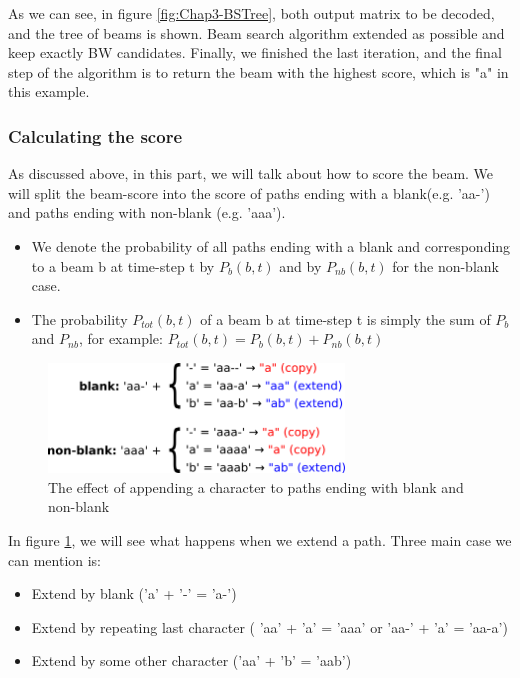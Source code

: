 As we can see, in figure \ref{fig:Chap3-BSTree}, both output matrix to be decoded, and the tree of beams is shown. Beam search algorithm extended as possible and keep exactly BW candidates. Finally, we finished the last iteration, and the final step of the algorithm is to return the beam with the highest score, which is "a" in this example.

\subsubsection{Calculating the score}

As discussed above, in this part, we will talk about how to score the beam. We will split the beam-score into the score of paths ending with a blank(e.g. 'aa-') and paths ending with non-blank (e.g. 'aaa').

\begin{itemize}
	\item We denote the probability of all paths ending with a blank and corresponding to a beam b at time-step t
	      by $ P_{b}(b,t) $ and by $ P_{nb}(b,t) $ for the non-blank case.
	\item The probability $P_{tot}(b,t)$ of a beam b at time-step t is simply the sum of $P_b$ and $P_{nb}$, for example:
	      $P_{tot}(b,t) = P_b(b,t) + P_{nb}(b,t)$
\end{itemize}

\begin{figure}[H]
	\centering
	\includegraphics[width=0.7\textwidth]{img/Chap3/CTC_Scoring}
	\caption{ The effect of appending a character to paths ending with blank and non-blank }
	\label{fig:Chap3-CTC_Scoring}
\end{figure}

In figure \ref{fig:Chap3-CTC_Scoring}, we will see what happens when we extend a path. Three main case we can mention
is:
\begin{itemize}
	\item Extend by blank ('a' + '-' = 'a-')
	\item Extend by repeating last character ( 'aa' + 'a' = 'aaa' or 'aa-' + 'a' = 'aa-a')
	\item Extend by some other character ('aa' + 'b' = 'aab')
\end{itemize}

